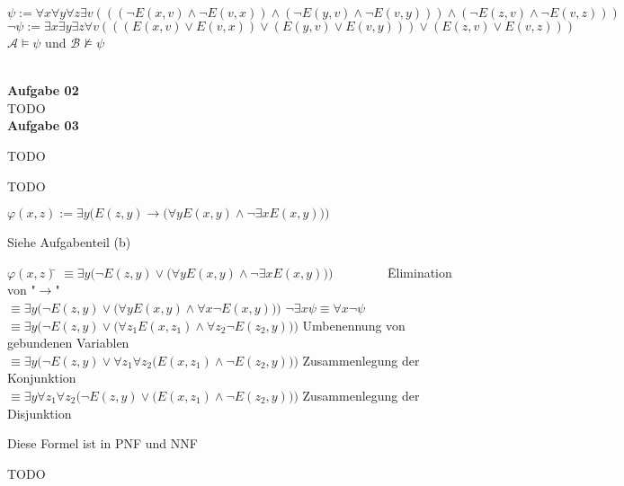 \documentclass[a4paper,10pt]{article}
\begin{document}
\begin{compactenum} [(a)]
		
		\item $ \psi := \forall x \forall y \forall z \exists v (((\lnot E(x,v)\wedge \lnot E(v,x))\wedge  (\lnot E(y,v)\wedge \lnot E(v,y)))\wedge (\lnot E(z,v)\wedge \lnot E(v,z))) $\\
		$ \lnot \psi := \exists x \exists y \exists z \forall v (((E(x,v)\vee E(v,x))\vee  (E(y,v)\vee E(v,y)))\vee (E(z,v)\vee E(v,z))) $ \\
		$ \mathcal{A} \models \psi $ und $ \mathcal{B} \not\models \psi$
	\end{compactenum}\ \\
	
	\textbf{Aufgabe 02}\\
	TODO
	\\
	
	\textbf{Aufgabe 03}\\
	\begin{compactenum} [(a)]
		\item \begin{compactenum} [(i)]
			\item TODO
			\item TODO
		\end{compactenum}
		\item $ \varphi(x,z) := \exists y \Big(E(z,y)\rightarrow \big(\forall y E(x,y) \wedge \lnot \exists x E(x,y)\big)\Big) $ \\
		\begin{compactenum} [(i)]
			\item Siehe Aufgabenteil (b)
			\\
			\item \begin{tabbing}
				$ \varphi(x,z) $\= $ \equiv \exists y \Big(\lnot E(z,y)\vee \big(\forall y E(x,y) \wedge \lnot \exists x E(x,y)\big)\Big) \qquad \qquad$ \= Elimination von "$ \rightarrow $"\\
				\> $ \equiv \exists y \Big(\lnot E(z,y)\vee \big(\forall y E(x,y) \wedge \forall x \lnot E(x,y)\big)\Big)$ \> $ \lnot \exists x \psi \equiv \forall x \lnot \psi $\\
				\> $ \equiv \exists y \Big(\lnot E(z,y)\vee \big(\forall z_1 E(x,z_1) \wedge \forall z_2 \lnot E(z_2,y)\big)\Big)$ \> Umbenennung von gebundenen Variablen\\
				\> $ \equiv \exists y \Big(\lnot E(z,y)\vee \forall z_1 \forall z_2 \big( E(x,z_1) \wedge \lnot E(z_2,y)\big)\Big)$ \> Zusammenlegung der Konjunktion\\
				\> $ \equiv \exists y \forall z_1 \forall z_2 \Big(\lnot E(z,y)\vee \big( E(x,z_1) \wedge \lnot E(z_2,y)\big)\Big)$ \> Zusammenlegung der Disjunktion\\
			\end{tabbing}
			Diese Formel ist in PNF und NNF
		\end{compactenum}
		\item TODO
	\end{compactenum}
\end{document}
